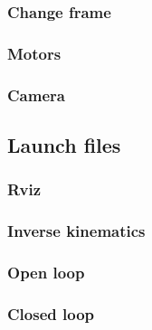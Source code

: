 \subsubsection{Change frame}

\subsubsection{Motors}

\subsubsection{Camera}

\subsection{Launch files}
\subsubsection{Rviz}

\subsubsection{Inverse kinematics}

\subsubsection{Open loop}

\subsubsection{Closed loop}